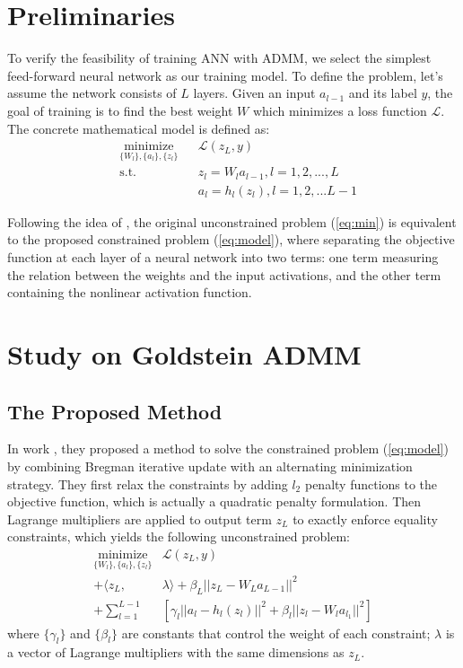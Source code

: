 \documentclass[letterpaper, 10 pt, conference]{ieeeconf}  %
\begin{document}
\section{Preliminaries}\label{preliminaries}
To verify the feasibility of training ANN with ADMM, we select the simplest feed-forward neural network as our training model. To define the problem, let's assume the network consists of $L$ layers. Given an input $a_{l-1}$ and its label $y$, the goal of training is to find the best weight $W$ which minimizes a loss function $\mathcal{L}$. The concrete mathematical model is defined as: 
\begin{equation}
\begin{aligned} 
& \underset{\{W_l\},\{a_l\}, \{z_l\}}{\text{minimize}}
& & \mathcal{L}(z_L,y) \\
& \text{s.t.}
& & z_l = W_la_{l-1},  l = 1,2,...,L \\
& & & a_l = h_l(z_l),  l = 1,2,...L-1 \label{eq:model}
\end{aligned}
\end{equation}

Following the idea of \cite{9}, the original unconstrained problem (\ref{eq:min}) is equivalent to the proposed constrained problem (\ref{eq:model}), where separating the objective function at each layer of a neural network into two terms: one term measuring the relation between the weights and the input activations, and the other term containing the nonlinear activation function. 



\section{Study on Goldstein ADMM} \label{studycase}
\subsection{The Proposed Method} \label{method}
In work \cite{9}, they proposed a method to solve the constrained problem (\ref{eq:model}) by combining Bregman iterative update with an alternating minimization strategy. They first relax the constraints by adding $l_2$ penalty functions to the objective function, which is actually a quadratic penalty formulation. Then  Lagrange multipliers are applied to output term $z_L$ to exactly enforce equality constraints, which yields the following unconstrained problem: \\
\begin{equation}
\begin{aligned}
\underset{\{W_l\},\{a_l\}, \{z_l\}}{\text{minimize}} & \mathcal{L}(z_L,y) \\
+  \langle z_L, &\lambda \rangle + \beta_L||z_L -W_La_{L-1}||^2 \\
+ \sum_{l=1}^{L-1}&[\gamma_l||a_l - h_l(z_l)||^2 + \beta_l||z_l - W_la_{l_1}||^2]
\label{eq:breg_model}
\end{aligned}
\end{equation}
where $\{\gamma_l \}$ and $\{\beta_l\}$ are constants that control the weight of each constraint; $\lambda$ is a vector of Lagrange multipliers with the same dimensions as $z_L$. 
\end{document}
